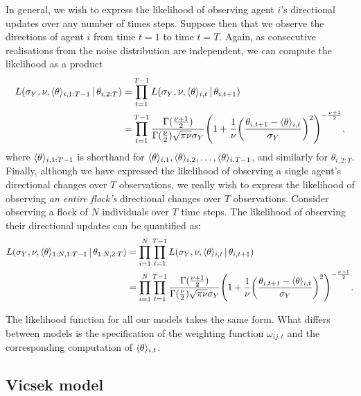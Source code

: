 In general, we wish to express the likelihood of observing agent $i$'s directional updates
over any number of times steps. Suppose then that we observe the directions of agent $i$
from time $t=1$ to time $t=T$. Again, as consecutive realisations from the noise
distribution are independent, we can compute the likelihood as a product
\begin{align*}
    L(\sigma_Y, \nu, \langle\theta\rangle_{i,1:T-1} \,|\, \theta_{i,2:T})
    =& \prod_{t=1}^{T-1} L(\sigma_Y,\nu,\langle\theta\rangle_{i,t} \,|\, \theta_{i,t+1}) \\
    =& \prod_{t=1}^{T-1} 
        \frac{\Gamma(\frac{\nu +1 }{2})}{\Gamma(\frac{\nu}{2})\sqrt{\pi\nu}\sigma_Y}
        \Bigg(1 + \frac{1}{\nu}
                  \bigg(\frac{\theta_{i,t+1}-\langle\theta\rangle_{i,t}}{\sigma_Y}\bigg)^2
        \Bigg)^{-\frac{\nu+1}{2}},
\end{align*}
where $\langle\theta\rangle_{i,1:T-1}$ is shorthand for
$\langle\theta\rangle_{i,1},\langle\theta\rangle_{i,2},\ldots,\langle\theta\rangle_{i,T-1}$, and
similarly for $\theta_{i,2:T}$. Finally, although we have expressed the likelihood of
observing a single agent's directional changes over $T$ observations, we really wish to
express the likelihood of observing \emph{an entire flock's} directional changes over $T$
observations. Consider observing a flock of $N$ individuals over $T$ time steps. The
likelihood of observing their directional updates can be quantified as:
\begin{align}
    \label{eq:likelihood}
    \begin{split}
    L(\sigma_Y, \nu, \langle\theta\rangle_{1:N,1:T-1} \,|\,\theta_{1:N,2:T}) 
    &= \prod_{i=1}^N \prod_{t=1}^{T-1} L(\sigma_Y,\nu,\langle\theta\rangle_{i,t}\,|\,\theta_{i,t+1})  \\
    &= \prod_{i=1}^N \prod_{t=1}^{T-1} 
        \frac{\Gamma(\frac{\nu +1 }{2})}{\Gamma(\frac{\nu}{2})\sqrt{\pi\nu}\sigma_Y}
        \Bigg(1 + \frac{1}{\nu}
                  \bigg(\frac{\theta_{i,t+1}-\langle\theta\rangle_{i,t}}{\sigma_Y}\bigg)^2
        \Bigg)^{-\frac{\nu+1}{2}}.
    \end{split}
\end{align}

The likelihood function for all our models takes the same form. What differs between
models is the specification of the weighting function $\omega_{ij,t}$ and the
corresponding computation of $\langle\theta\rangle_{i,t}$.

\subsection{Vicsek model}

